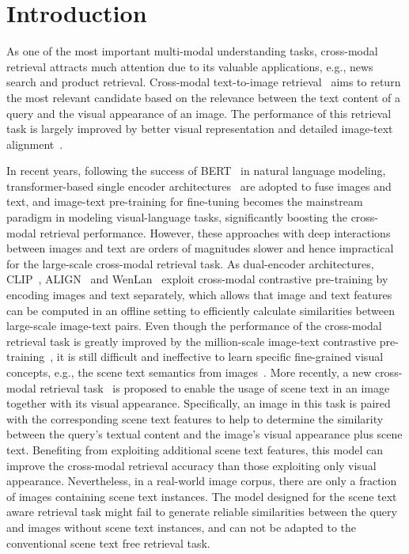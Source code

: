 \documentclass[10pt,twocolumn,letterpaper]{article}
\begin{document}
\vspace{-1em}
\section{Introduction}\label{sec:intro}
As one of the most important multi-modal understanding tasks, cross-modal retrieval attracts much attention due to its valuable applications, e.g., news search and product retrieval. Cross-modal text-to-image retrieval~\cite{frome2013devise,faghri2017vse++,SCAN} aims to return the most relevant candidate based on the relevance between the text content of a query and the visual appearance of an image. The performance of this retrieval task is largely improved by better 
visual representation and detailed image-text alignment~\cite{SCAN, VSRN, GSMN, IMRAM}. 

\vspace{-0.08em}
In recent years, following the success of BERT~\cite{BERT} in natural language modeling, transformer-based single encoder architectures~\cite{vilbert, imagebert, unicoder, UNITER, oscar, ERNIE-ViL, vinvl, Pixel-BERT, SOHO, ViLT, xue2021probing} are adopted to fuse images and text, and image-text pre-training for fine-tuning becomes the mainstream paradigm in modeling visual-language tasks, significantly boosting the cross-modal retrieval performance. However, these approaches with deep interactions between images and text are orders of magnitudes slower and hence impractical for the large-scale cross-modal retrieval task. As dual-encoder architectures, CLIP~\cite{CLIP}, ALIGN~\cite{ALIGN} and WenLan~\cite{wenlan} exploit cross-modal contrastive pre-training by encoding images and text separately, which allows that image and text features can be computed in an offline setting to efficiently calculate similarities between large-scale image-text pairs. Even though the performance of the cross-modal retrieval task is greatly improved by the million-scale image-text contrastive pre-training~\cite{CLIP}, it is still difficult and ineffective to learn specific fine-grained visual concepts, e.g., the scene text semantics from images~\cite{CLIP}. 
More recently, a new cross-modal retrieval task~\cite{STARNet} is proposed to enable the usage of scene text in an image together with its visual appearance. Specifically, an image in this task is paired with the corresponding scene text features to help to determine the similarity between the query's textual content and the image's visual appearance plus scene text. Benefiting from exploiting additional scene text features, this model can improve the cross-modal retrieval accuracy than those exploiting only visual appearance. Nevertheless, in a real-world image corpus, there are only a fraction of images containing scene text instances. 
The model designed for the scene text aware retrieval task might fail to generate reliable similarities between the query and images without scene text instances, and can not be adapted to the conventional scene text free retrieval task.
\end{document}
